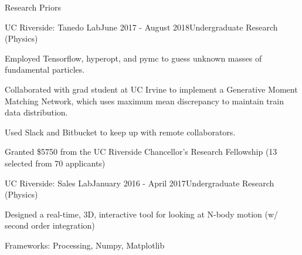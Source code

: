 \documentclass{resume} %
\begin{document}
\begin{rSection}{Research Priors}

\begin{rSubsection}{UC Riverside: Tanedo Lab}{June 2017 - August 2018}{Undergraduate Research (Physics)}{}
\item Employed Tensorflow, hyperopt, and pymc to guess unknown masses of fundamental particles.
\item Collaborated with grad student at UC Irvine to implement a Generative Moment Matching Network, which uses maximum mean discrepancy to maintain train data distribution.
\item Used Slack and Bitbucket to keep up with remote collaborators.
\item Granted \$5750 from the UC Riverside Chancellor's Research Fellowship (13 selected from 70 applicants)
\end{rSubsection}



\begin{rSubsection}{UC Riverside: Sales Lab}{January 2016 - April 2017}{Undergraduate Research (Physics)}{}
\item Designed a real-time, 3D, interactive tool for looking at N-body motion (w/ second order integration)
\item Frameworks: Processing, Numpy, Matplotlib
\end{rSubsection}

\end{rSection}


\end{document}
